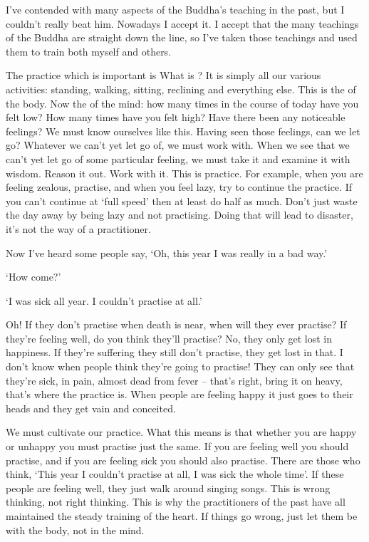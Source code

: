 I've contended with many aspects of the Buddha's teaching in the past, but I couldn't really beat him. Nowadays I accept it. I accept that the many teachings of the Buddha are straight down the line, so I've taken those teachings and used them to train both myself and others.

The practice which is important is  What is ? It is simply all our various activities: standing, walking, sitting, reclining and everything else. This is the  of the body. Now the  of the mind: how many times in the course of today have you felt low? How many times have you felt high? Have there been any noticeable feelings? We must know ourselves like this. Having seen those feelings, can we let go? Whatever we can't yet let go of, we must work with. When we see that we can't yet let go of some particular feeling, we must take it and examine it with wisdom. Reason it out. Work with it. This is practice. For example, when you are feeling zealous, practise, and when you feel lazy, try to continue the practice. If you can't continue at `full speed' then at least do half as much. Don't just waste the day away by being lazy and not practising. Doing that will lead to disaster, it's not the way of a practitioner.

Now I've heard some people say, `Oh, this year I was really in a bad way.'

`How come?'

`I was sick all year. I couldn't practise at all.'

Oh! If they don't practise when death is near, when will they ever practise? If they're feeling well, do you think they'll practise? No, they only get lost in happiness. If they're suffering they still don't practise, they get lost in that. I don't know when people think they're going to practise! They can only see that they're sick, in pain, almost dead from fever -- that's right, bring it on heavy, that's where the practice is. When people are feeling happy it just goes to their heads and they get vain and conceited.

We must cultivate our practice. What this means is that whether you are happy or unhappy you must practise just the same. If you are feeling well you should practise, and if you are feeling sick you should also practise. There are those who think, `This year I couldn't practise at all, I was sick the whole time'. If these people are feeling well, they just walk around singing songs. This is wrong thinking, not right thinking. This is why the practitioners of the past have all maintained the steady training of the heart. If things go wrong, just let them be with the body, not in the mind.

